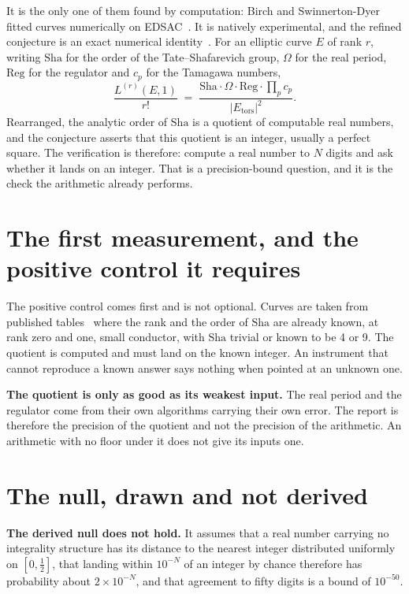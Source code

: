 It is the only one of them found by computation: Birch and Swinnerton-Dyer fitted curves numerically
on EDSAC~\cite{src:Birch-and-Swinnerton-Dyer-1965}. It is natively experimental, and the refined
conjecture is an exact numerical identity~\cite{src:Wiles}. For an elliptic curve $E$ of rank $r$,
writing $\mathrm{Sha}$ for the order of the Tate--Shafarevich group, $\Omega$ for the real period,
$\mathrm{Reg}$ for the regulator and $c_p$ for the Tamagawa numbers,
\[
  \frac{L^{(r)}(E,1)}{r!} \;=\; \frac{\mathrm{Sha}\cdot\Omega\cdot\mathrm{Reg}\cdot\prod_p c_p}
                                    {|E_{\mathrm{tors}}|^2}.
\]
Rearranged, the analytic order of $\mathrm{Sha}$ is a quotient of computable real numbers, and the
conjecture asserts that this quotient is an integer, usually a perfect square. The verification is
therefore: compute a real number to $N$ digits and ask whether it lands on an integer. That is a
precision-bound question, and it is the check the arithmetic already performs.

\section{The first measurement, and the positive control it requires}

The positive control comes first and is not optional. Curves are taken from published
tables~\cite{src:Cremona-1997} where the rank and the order of $\mathrm{Sha}$ are already known, at
rank zero and one, small conductor, with $\mathrm{Sha}$ trivial or known to be 4 or 9. The quotient
is computed and must land on the known integer. An instrument that cannot reproduce a known answer
says nothing when pointed at an unknown one.

\textbf{The quotient is only as good as its weakest input.} The real period and the regulator come
from their own algorithms carrying their own error. The report is therefore the precision of the
quotient and not the precision of the arithmetic. An arithmetic with no floor under it does not give
its inputs one.

\section{The null, drawn and not derived}

\textbf{The derived null does not hold.} It assumes that a real number carrying no integrality
structure has its distance to the nearest integer distributed uniformly on $[0,\tfrac12]$, that
landing within $10^{-N}$ of an integer by chance therefore has probability about $2\times10^{-N}$,
and that agreement to fifty digits is a bound of $10^{-50}$.

